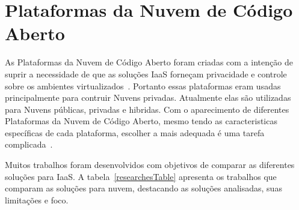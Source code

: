 \chapter{Plataformas da Nuvem de Código Aberto}

As Plataformas da Nuvem de Código Aberto foram criadas com a intenção de suprir a necessidade de que as soluções IaaS forneçam privacidade e controle sobre os ambientes virtualizados~\cite{Barkat:2015}. Portanto essas plataformas eram usadas principalmente para contruir Nuvens privadas. Atualmente elas são utilizadas para Nuvens públicas, privadas e hibridas. Com o aparecimento de diferentes Plataformas da Nuvem de Código Aberto, mesmo tendo as caracteristicas específicas de cada plataforma, escolher a mais adequada é uma tarefa complicada~\cite{Barkat:2015}.

Muitos trabalhos foram desenvolvidos com objetivos de comparar as diferentes soluções para IaaS. A tabela~\ref{researchesTable} apresenta os trabalhos que comparam as soluções para nuvem, destacando as soluções analisadas, suas limitações e foco.

